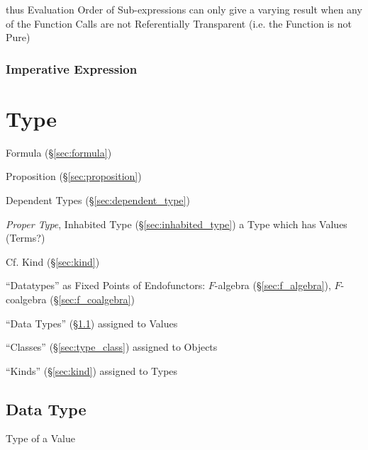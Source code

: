 thus Evaluation Order of Sub-expressions can only give a varying
result when any of the Function Calls are not Referentially
Transparent (i.e. the Function is not Pure)




\subsubsection{Imperative Expression}\label{sec:imperative_expression}




\section{Type}\label{sec:type}

Formula (\S\ref{sec:formula})

Proposition (\S\ref{sec:proposition})


Dependent Types (\S\ref{sec:dependent_type})

\emph{Proper Type}, Inhabited Type (\S\ref{sec:inhabited_type}) a Type
which has Values (Terms?)

\fist Cf. Kind (\S\ref{sec:kind})


``Datatypes'' as Fixed Points of Endofunctors: $F$-algebra
(\S\ref{sec:f_algebra}), $F$-coalgebra (\S\ref{sec:f_coalgebra})

``Data Types'' (\S\ref{sec:data_type}) assigned to Values

``Classes'' (\S\ref{sec:type_class}) assigned to Objects

``Kinds'' (\S\ref{sec:kind}) assigned to Types



\subsection{Data Type}\label{sec:data_type}

Type of a Value



